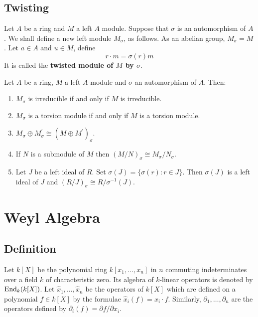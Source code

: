 \documentclass[12pt, oneside]{book}
\begin{document}
\section{Twisting} %

\begin{definition}
    Let $A$ be a ring and $M$ a left $A$ module. Suppose that $\sigma$ is an automorphism of $A$. We shall define a new left module $M_\sigma$, as follows. As an abelian group, $M_\sigma=M$. Let $a \in A$ and $u \in M$, define
    \begin{equation*}
        r \cdot m=\sigma(r) m
    \end{equation*}
    It is called the \textbf{twisted module of $M$ by $\sigma$}.
\end{definition}

\begin{proposition}
    \label{pro: Twisting module}
    Let $A$ be a ring, $M$ a left $A$-module and $\sigma$ an automorphism of $A$. Then:
    \begin{enumerate}
        \item
              $M_\sigma$ is irreducible if and only if $M$ is irreducible.
        \item
              $M_\sigma$ is a torsion module if and only if $M$ is a torsion module.
        \item  $M_\sigma\oplus M^\prime_\sigma \cong (M \oplus M^\prime)_\sigma$.
        \item
              If $N$ is a submodule of $M$ then $(M / N)_\sigma \cong M_\sigma / N_\sigma$.
        \item
              Let $J$ be a left ideal of $R$. Set $\sigma(J)=\{\sigma(r): r \in J\}$. Then $\sigma(J)$ is a left ideal of $J$ and $(R / J)_\sigma \cong R / \sigma^{-1}(J)$.
    \end{enumerate}
\end{proposition}










\chapter{Weyl Algebra} %
\section{Definition}

Let $k[X]$ be the polynomial ring $k\left[x_1, \ldots, x_n\right]$ in $n$ commuting indeterminates over a field $k$ of characteristic zero.
Its algebra of $k$-linear operators is denoted by $\operatorname{\operatorname{End}}_k (k[X])$.
Let $\hat{x}_1, \ldots, \hat{x}_n$ be the operators of $k[X]$ which are defined on a polynomial $f \in k[X]$ by the formulae $\hat{x}_i(f)=x_i \cdot f$.
Similarly, $\partial_1, \ldots, \partial_n$ are the operators defined by $\partial_i(f)=\partial f / \partial x_i$.
\end{document}
